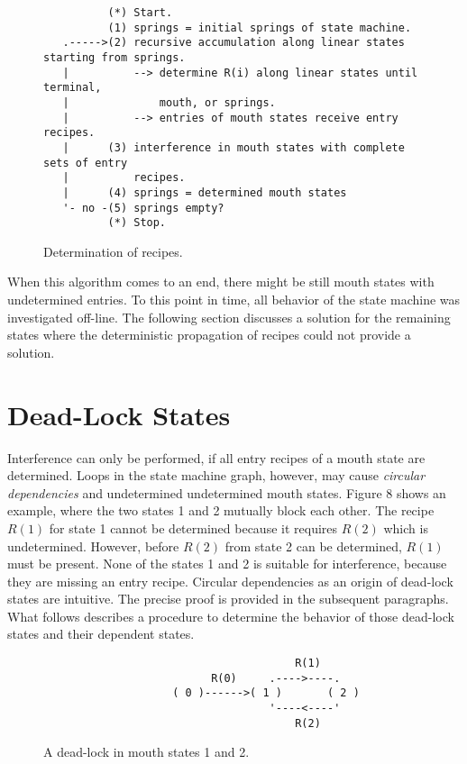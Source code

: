 \documentclass[12pt,a4paper]{scrartcl}
\begin{document}
\begin{figure}[htbp] \leavevmode
\begin{verbatim}
          (*) Start.
          (1) springs = initial springs of state machine.
   .----->(2) recursive accumulation along linear states starting from springs.
   |          --> determine R(i) along linear states until terminal,
   |              mouth, or springs.
   |          --> entries of mouth states receive entry recipes.
   |      (3) interference in mouth states with complete sets of entry
   |          recipes.
   |      (4) springs = determined mouth states
   '- no -(5) springs empty?
          (*) Stop.
\end{verbatim}

\caption{Determination of recipes.}
\end{figure}

When this algorithm comes to an end, there might be still mouth states with
undetermined entries.  To this point in time, all behavior of the state machine
was investigated off-line. The following section discusses a solution for the
remaining states where the deterministic propagation of recipes could not
provide a solution.

%
\section{Dead-Lock States}

Interference can only be performed, if all entry recipes of a mouth state are
determined. Loops in the state machine graph, however, may cause
\textit{circular dependencies} and undetermined undetermined mouth states.
Figure 8 shows an example, where the two states 1 and 2 mutually block each
other. The recipe $R(1)$ for state 1 cannot be determined because it requires
$R(2)$ which is undetermined. However, before $R(2)$ from state 2 can be
determined, $R(1)$ must be present. None of the states 1 and 2 is suitable for
interference, because they are missing an entry recipe.  Circular dependencies
as an origin of dead-lock states are intuitive. The precise proof is provided
in the subsequent paragraphs. What follows describes a procedure to determine
the behavior of those dead-lock states and their dependent states.

\begin{figure}[htbp] \leavevmode
\begin{verbatim}
                                       R(1)
                          R(0)     .---->----.
                    ( 0 )------>( 1 )       ( 2 )
                                   '----<----'
                                       R(2)

\end{verbatim}
\caption{A dead-lock in mouth states 1 and 2.}
\end{figure}
\end{document}
